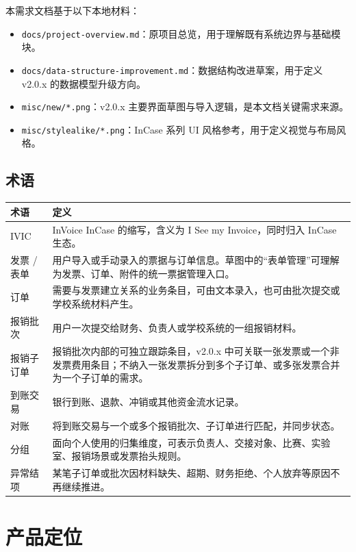 \documentclass[UTF8,zihao=-4]{ctexart}
\begin{document}
本需求文档基于以下本地材料：

\begin{itemize}
  \item \texttt{docs/project-overview.md}：原项目总览，用于理解既有系统边界与基础模块。
  \item \texttt{docs/data-structure-improvement.md}：数据结构改进草案，用于定义 v2.0.x 的数据模型升级方向。
  \item \texttt{misc/new/*.png}：v2.0.x 主要界面草图与导入逻辑，是本文档关键需求来源。
  \item \texttt{misc/stylealike/*.png}：InCase 系列 UI 风格参考，用于定义视觉与布局风格。
\end{itemize}

\subsection{术语}

\begin{longtable}{p{3.2cm}p{11.2cm}}
\toprule
术语 & 定义 \\
\midrule
IVIC & InVoice InCase 的缩写，含义为 I See my Invoice，同时归入 InCase 生态。 \\
发票 / 表单 & 用户导入或手动录入的票据与订单信息。草图中的“表单管理”可理解为发票、订单、附件的统一票据管理入口。 \\
订单 & 需要与发票建立关系的业务条目，可由文本录入，也可由批次提交或学校系统材料产生。 \\
报销批次 & 用户一次提交给财务、负责人或学校系统的一组报销材料。 \\
报销子订单 & 报销批次内部的可独立跟踪条目，v2.0.x 中可关联一张发票或一个非发票费用条目；不纳入一张发票拆分到多个子订单、或多张发票合并为一个子订单的需求。 \\
到账交易 & 银行到账、退款、冲销或其他资金流水记录。 \\
对账 & 将到账交易与一个或多个报销批次、子订单进行匹配，并同步状态。 \\
分组 & 面向个人使用的归集维度，可表示负责人、交接对象、比赛、实验室、报销场景或发票抬头规则。 \\
异常结项 & 某笔子订单或批次因材料缺失、超期、财务拒绝、个人放弃等原因不再继续推进。 \\
\bottomrule
\end{longtable}

\section{产品定位}
\end{document}
